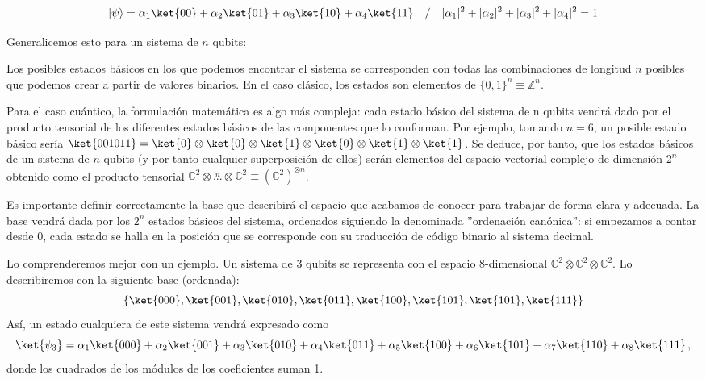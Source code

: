 \documentclass[11pt,a4paper,twoside,pdf]{article}
\numberwithin{equation}{section}
\begin{document}
			\begin{equation} \label{eq: Superposicion2}\notag
				|\psi\rangle = \alpha_1 \ket{00} + \alpha_2 \ket{01} + \alpha_3 \ket{10} + \alpha_4 \ket{11} \quad / \quad |\alpha_1|^2+|\alpha_2|^2+|\alpha_3|^2+|\alpha_4|^2=1					
			\end{equation}
				
		Generalicemos esto para un sistema de $n$ qubits:
		
		Los posibles estados básicos en los que podemos encontrar el sistema se corresponden con todas las combinaciones de longitud $n$ posibles que podemos crear a partir de valores binarios. En el caso clásico, los estados son elementos de $\{0,1\}^n \equiv \mathbb{Z}^n$. 
		
		Para el caso cuántico, la formulación matemática es algo más compleja: cada estado básico del sistema de n qubits vendrá dado por el producto tensorial de los diferentes estados básicos de las componentes que lo conforman. Por ejemplo, tomando $n=6$, un posible estado básico sería $\ket{001011}=\ket{0} \otimes\ket{0} \otimes\ket{1} \otimes\ket{0} \otimes\ket{1} \otimes\ket{1}$. Se deduce, por tanto, que los estados básicos de un sistema de $n$ qubits (y por tanto cualquier superposición de ellos) serán elementos del espacio vectorial complejo de dimensión $2^n$ obtenido como el producto tensorial $\mathbb{C}^2 \otimes \overset{n}{...} \otimes \mathbb{C}^2 \equiv \left( \mathbb{C}^2\right)^{\otimes n} $.
		
		Es importante definir correctamente la base que describirá el espacio que acabamos de conocer para trabajar de forma clara y adecuada. La base vendrá dada por los $2^n$ estados básicos del sistema, ordenados siguiendo la denominada ''ordenación canónica'': si empezamos a contar desde 0, cada estado se halla en la posición que se corresponde con su traducción de código binario al sistema decimal. 
		
		Lo comprenderemos mejor con un ejemplo.	Un sistema de 3 qubits se representa con el espacio 8-dimensional $\mathbb{C}^2\otimes \mathbb{C}^2 \otimes \mathbb{C}^2$. Lo describiremos con la siguiente base (ordenada):
			\begin{equation} \notag
				\{\ket{000},\ket{001},\ket{010},\ket{011},\ket{100},\ket{101},\ket{101},\ket{111}\}
			\end{equation}
		Así, un estado cualquiera de este sistema vendrá expresado como 
			\begin{equation}  \notag
			\ket{\psi_3} = \alpha_1 \ket{000} + \alpha_2 \ket{001} + \alpha_3 \ket{010} + \alpha_4 \ket{011} + \alpha_5 \ket{100} + \alpha_6 \ket{101} + \alpha_7 \ket{110} + \alpha_8 \ket{111} \, ,
			\end{equation}
		donde los cuadrados de los módulos de los coeficientes suman 1.
		
\end{document}
